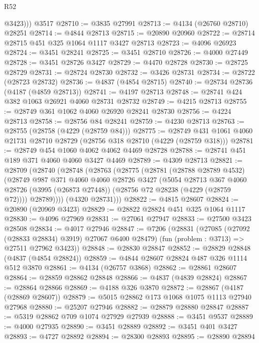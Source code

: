\begin{lexlean}{R52}
\begin{coremodule}
          @3423)))
    @3517
@28710 := @3835 @27991
@28713 := @4134 (@26760 @28710) @28251
@28714 := @4844 @28713
@28715 := @20890 @20960
@28722 := @28714 @28715 @451 @325 @1064 @1117 @3427 @28713
@28723 := @4096 @26923
@28724 := @3451 @28241
@28725 := @3451 @28710
@28726 := @4000 @27449
@28728 := @3451 @28726 @3427
@28729 := @4470 @28728
@28730 := @28725 @28729
@28731 := @28724 @28730
@28732 := @3426 @28731
@28734 := @28722 (@28723 @28732)
@28736 := @4837 (@4854 @28715)
@28740 := @28734 @28736 (@4187 (@4859 @28713))
@28741 := @4197 @28713
@28748 := @28741 @424 @382 @1063 @26921 @4060 @28731 @28732
@28749 := @4215 @28713
@28755 := @28749 @361 @1062 @4060 @26920 @28241 @28730
@28756 := @4224 @28713
@28758 := @28756 @84 @28241
@28759 := @4230 @28713
@28763 := @28755 (@28758 (@4229 (@28759 @84)))
@28775 := @28749 @431 @1061 @4060 @21731 @28710 @28729 (@28756 @318 @28710 (@4229 (@28759 @318)))
@28781 := @28749 @454 @1060 @4062 @4062 @4469 @28728
@28788 := @28741 @451 @189 @371 @4060 @4060 @3427 @4469
@28789 := @4309 @28713
@28821 := @28709
    (@28740
      (@28748
        (@28763
          (@28775
            (@28781
              (@28788 @28789 @4532)
              (@28749
                @987
                @371
                @4060
                @4060
                @28726
                @3427
                (@5054
                  @28713
                  @367
                  @4060
                  @28726
                  (@3995 (@26873 @27448))
                  (@28756 @72 @28238 (@4229 (@28759 @72))))
                @28789))))
        (@4320 @28731)))
@28822 := @4815 @28607
@28824 := @20890 (@20969 @3423)
@28829 := @28822 @28824 @451 @325 @1064 @1117
@28830 := @4096 @27969
@28831 := @27061 @27947
@28833 := @27500 @3423 @28508
@28834 := @4017 @27946
@28847 := @7206
    (@28831
      (@27085 (@27092 (@28833 @28834) @3919) @27067 @6400 @28479)
      (fun (problem : @3713) => @27511 @27962 @3423))
@28848 := @28830 @28847
@28852 := @28829 @28848 (@4837 (@4854 @28824))
@28859 := @4844 @28607 @28824 @487 @326 @1114 @512 @3870
@28861 := @4134 (@26757 @3868)
@28862 := @28861 @28607
@28864 := @28859 @28862 @28848
@28866 := @4837 (@4839 @28824)
@28867 := @28864 @28866
@28869 := @4188 @326 @3870
@28872 := @28867 (@4187 (@28869 @28607))
@28879 := @5015 @28862 @173 @1068 @1075 @1113 @27940 @27968
@28880 := @25207 @27946
@28882 := @28879 @28880 @28847
@28887 := @5319 @28862 @709 @1074 @27929 @27939
@28888 := @3451 @9537
@28889 := @4000 @27935
@28890 := @3451 @28889
@28892 := @3451 @401 @3427
@28893 := @4727 @28892
@28894 := @28300 @28893
@28895 := @28890 @28894

\end{coremodule}
\end{lexlean}
